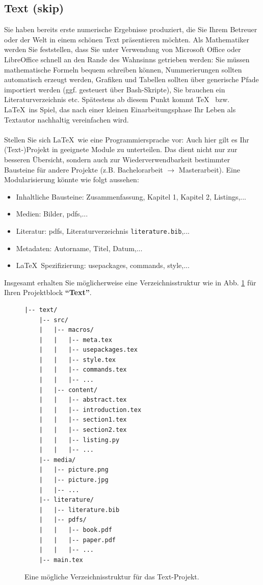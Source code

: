 \subsection{Text (skip)}
Sie haben bereits erste numerische Ergebnisse produziert, die Sie Ihrem Betreuer oder der Welt in einem schönen Text präsentieren möchten. Als Mathematiker werden Sie feststellen, dass Sie unter Verwendung von Microsoft Office oder LibreOffice schnell an den Rande des Wahnsinns getrieben werden: Sie müssen mathematische Formeln bequem schreiben können, Nummerierungen sollten automatisch erzeugt werden, Grafiken und Tabellen sollten über generische Pfade importiert werden (ggf. gesteuert über Bash-Skripte), Sie brauchen ein Literaturverzeichnis etc. Spätestens ab diesem Punkt kommt \TeX~ bzw. \LaTeX~ins Spiel, das nach einer kleinen Einarbeitungsphase Ihr Leben als Textautor nachhaltig vereinfachen wird.\\
~\\
Stellen Sie sich \LaTeX~wie eine Programmiersprache vor: Auch hier gilt es Ihr (Text-)Projekt in geeignete Module zu unterteilen. Das dient nicht nur zur besseren Übersicht, sondern auch zur Wiederverwendbarkeit bestimmter Bausteine für andere Projekte (z.B. Bachelorarbeit $\to$ Masterarbeit). Eine Modularisierung könnte wie folgt aussehen:
\begin{itemize}
	\item Inhaltliche Bausteine: Zusammenfassung, Kapitel 1, Kapitel 2, Listings,...
	\item Medien: Bilder, pdfs,...
	\item Literatur: pdfs, Literaturverzeichnis \texttt{literature.bib},...
	\item Metadaten: Autorname, Titel, Datum,...
	\item \LaTeX~Spezifizierung: usepackages, commands, style,...
\end{itemize}
Insgesamt erhalten Sie möglicherweise eine Verzeichnisstruktur wie in Abb. \ref{fig:vz-struktur-text} für Ihren Projektblock \textbf{``Text''}.\\
\begin{figure}[h!]
	\centering
\begin{minipage}{0.4\textwidth}
\begin{verbatim}
|-- text/
    |-- src/
    |   |-- macros/
    |   |   |-- meta.tex
    |   |   |-- usepackages.tex
    |   |   |-- style.tex
    |   |   |-- commands.tex
    |   |   |-- ...
    |   |-- content/
    |   |   |-- abstract.tex
    |   |   |-- introduction.tex
    |   |   |-- section1.tex
    |   |   |-- section2.tex
    |   |   |-- listing.py
    |   |   |-- ...    
    |-- media/
    |   |-- picture.png
    |   |-- picture.jpg
    |   |-- ...
    |-- literature/
    |   |-- literature.bib
    |   |-- pdfs/
    |   |   |-- book.pdf      
    |   |   |-- paper.pdf   
    |   |   |-- ... 
    |-- main.tex
\end{verbatim}
\end{minipage}
	\caption[Beispiel: Verzeichnisstruktur für \texttt{text}]{Eine mögliche Verzeichnisstruktur für das Text-Projekt.}
	\label{fig:vz-struktur-text}
\end{figure}
